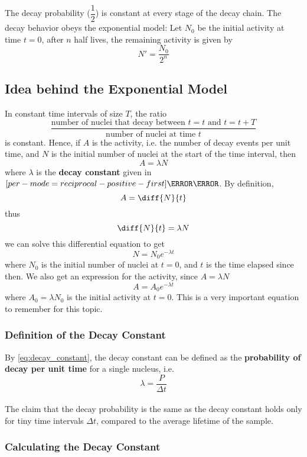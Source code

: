 \documentclass[a4paper,12pt]{article}
\let\oldsi\si
\renewcommand{\si}[1]{\oldsi[per-mode=reciprocal-positive-first]{#1}}
\newcommand{\lb}{\\[8pt]}
\begin{document}
The decay probability ($\dfrac{1}{2}$) is constant at every stage of the decay chain. The decay behavior obeys the exponential model: Let $N_0$ be the initial activity at time $t = 0$, after $n$ half lives, the remaining activity is given by
$$N' = \frac{N_0}{2^n}$$

\subsection{Idea behind the Exponential Model}

In constant time intervals of size $T$, the ratio $$\frac{\text{number of nuclei that decay between $t = t$ and $t = t + T$}}{\text{number of nuclei at time $t$}}$$
is constant.
Hence, if $A$ is the activity, i.e. the number of decay events per unit time, and $N$ is the initial number of nuclei at the start of the time interval, then \begin{equation}\label{eq:decay_constant}
  A = \lambda N
\end{equation}where $\lambda$ is the \textbf{decay constant} given in $\si{\per\second}$.
By definition, $$A = \diff{N}{t}$$
thus $$\diff{N}{t} = \lambda N$$
we can solve this differential equation to get \begin{equation}\label{eq:NN_0}
  N = N_0 e^{-\lambda t}
\end{equation}
where $N_0$ is the initial number of nuclei at $t = 0$, and $t$ is the time elapsed since then.
We also get an expression for the activity, since $A = \lambda N$
$$A = A_0 e^{-\lambda t}$$
where $A_0 = \lambda N_0$ is the initial activity at $t = 0$. This is a very important equation to remember for this topic.

\subsubsection{Definition of the Decay Constant}

By \cref{eq:decay_constant}, the decay constant can be defined as the \textbf{probability of decay per unit time} for a single nucleus, i.e. $$\lambda = \frac{P}{\Delta t}$$\lb
The claim that the decay probability is the same as the decay constant holds only for tiny time intervals $\Delta t$, compared to the average lifetime of the sample.

\subsubsection{Calculating the Decay Constant}
\end{document}
